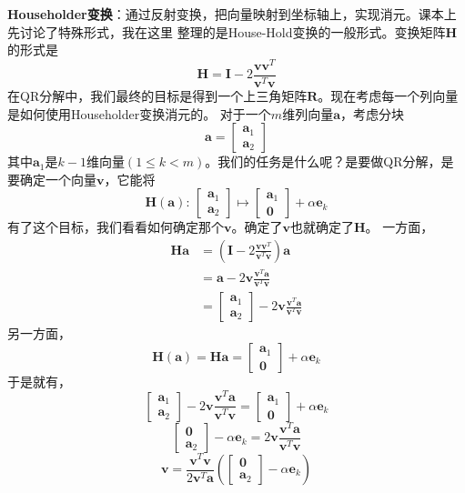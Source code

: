 \documentclass[14pt, letterpaper, UTF8, fontset=windowsnew, heading=true]{article}
\begin{document}
\textbf{Householder变换}：通过反射变换，把向量映射到坐标轴上，实现消元。课本上先讨论了特殊形式，我在这里
整理的是House-Hold变换的一般形式。变换矩阵$\bm{H}$的形式是
$$\bm{H} = \bm{I} - 2\frac{\bm{vv}^T}{\bm{v}^T\bm{v}}$$
在QR分解中，我们最终的目标是得到一个上三角矩阵$\bm{R}$。现在考虑每一个列向量是如何使用Householder变换消元的。
对于一个$m$维列向量$\bm{a}$，考虑分块
$$\bm{a}=\begin{bmatrix}\bm{a}_1\\\bm{a}_2\end{bmatrix}$$
其中$\bm{a}_1$是$k-1$维向量$(1\leq k< m)$。我们的任务是什么呢？是要做QR分解，是要确定一个向量$\bm{v}$，它能将
$$\bm{H}(\bm{a}):\,
\begin{bmatrix}\bm{a}_1\\ \bm{a}_2\end{bmatrix}
\mapsto
\begin{bmatrix}\bm{a}_1\\ \bm{0}\end{bmatrix} + \alpha \bm{e}_k
$$
有了这个目标，我们看看如何确定那个$\bm{v}$。确定了$\bm{v}$也就确定了$\bm{H}$。
一方面，
$$\begin{aligned}
\bm{Ha}
&=\left(\bm{I}-2\frac{\bm{v}\bm{v}^T}{\bm{v}^T\bm{v}}\right)\bm{a}\\
&=\bm{a}-2\bm{v}\frac{\bm{v}^T\bm{a}}{\bm{v}^T\bm{v}}\\
&=\begin{bmatrix}\bm{a}_1\\ \bm{a}_2\end{bmatrix}-2\bm{v}\frac{\bm{v}^T\bm{a}}{\bm{v}^T\bm{v}}
\end{aligned}$$
另一方面，
$$\bm{H}(\bm{a})=\bm{Ha}=\begin{bmatrix}\bm{a}_1\\ \bm{0}\end{bmatrix} + \alpha \bm{e}_k$$
于是就有，
$$\begin{bmatrix}\bm{a}_1\\ \bm{a}_2\end{bmatrix}-2\bm{v}\frac{\bm{v}^T\bm{a}}{\bm{v}^T\bm{v}}
=\begin{bmatrix}\bm{a}_1\\ \bm{0}\end{bmatrix} + \alpha \bm{e}_k$$
$$\begin{bmatrix}\bm{0}\\ \bm{a}_2\end{bmatrix} - \alpha \bm{e}_k 
=2\bm{v}\frac{\bm{v}^T\bm{a}}{\bm{v}^T\bm{v}}$$
$$\bm{v}=\frac{\bm{v}^T\bm{v}}{2\bm{v}^T\bm{a}}
\left( \begin{bmatrix}\bm{0}\\ \bm{a}_2\end{bmatrix} - \alpha \bm{e}_k \right)$$
\end{document}
